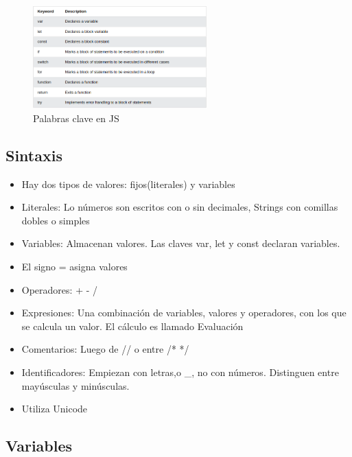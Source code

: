 \documentclass{article}
\begin{document}
 \begin{figure}[H]
   \centering
   \includegraphics[width=0.6\textwidth]{img/table1.png}
   \caption{Palabras clave en JS}
 \end{figure}

 \subsection{Sintaxis}

 \begin{itemize}
   \item Hay dos tipos de valores: fijos(literales) y variables
   \item  Literales: Lo números son escritos con o sin decimales, Strings con comillas dobles o simples
   \item Variables: Almacenan valores. Las claves var, let y const declaran variables.
   \item El signo = asigna valores
   \item Operadores: + -  /
   \item Expresiones: Una combinación de variables, valores y operadores, con los que se calcula un valor. El cálculo es llamado Evaluación
   \item Comentarios: Luego de // o entre /* */
   \item Identificadores: Empiezan con letras,\textdollar o _, no con números. Distinguen entre mayúsculas y minúsculas.
   \item Utiliza Unicode
 \end{itemize}

 \subsection{Variables}
\end{document}
